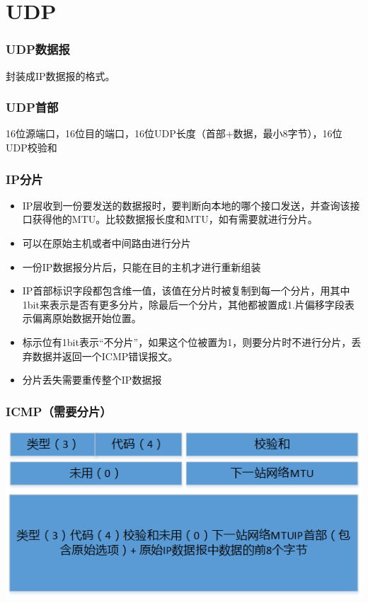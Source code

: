 \section{UDP}

\subsubsection{UDP数据报}

封装成IP数据报的格式。



\subsubsection{UDP首部}

16位源端口，16位目的端口，16位UDP长度（首部+数据，最小8字节），16位UDP校验和

\subsubsection{IP分片}

\begin{itemize}
\item IP层收到一份要发送的数据报时，要判断向本地的哪个接口发送，并查询该接口获得他的MTU。比较数据报长度和MTU，如有需要就进行分片。

\item 可以在原始主机或者中间路由进行分片

\item 一份IP数据报分片后，只能在目的主机才进行重新组装

\item IP首部标识字段都包含维一值，该值在分片时被复制到每一个分片，用其中1bit来表示是否有更多分片，除最后一个分片，其他都被置成1.片偏移字段表示偏离原始数据开始位置。

\item 标示位有1bit表示“不分片”，如果这个位被置为1，则要分片时不进行分片，丢弃数据并返回一个ICMP错误报文。

\item 分片丢失需要重传整个IP数据报
\end{itemize}

\subsubsection{ICMP（需要分片）}

\includegraphics[scale=1]{protocol/resources/ICMP-header.png}

